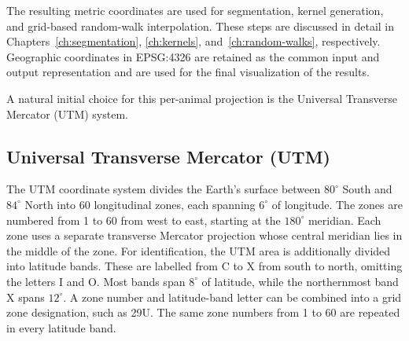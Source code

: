 The resulting metric coordinates are used for segmentation, kernel generation, and grid-based random-walk interpolation. 
These steps are discussed in detail in Chapters~\ref{ch:segmentation}, \ref{ch:kernels}, and~\ref{ch:random-walks}, respectively. 
Geographic coordinates in EPSG:4326 are retained as the common input and output representation and are used for the final visualization of the results.

A natural initial choice for this per-animal projection is the Universal Transverse Mercator (UTM) system.

\subsection{Universal Transverse Mercator (UTM)}
The UTM coordinate system divides the Earth's surface between \(80^\circ\) South and \(84^\circ\) North into 60 longitudinal zones, each spanning \(6^\circ\) of longitude. 
The zones are numbered from 1 to 60 from west to east, starting at the \(180^\circ\) meridian. 
Each zone uses a separate transverse Mercator projection whose central meridian lies in the middle of the zone.
For identification, the UTM area is additionally divided into latitude bands. These are labelled from C to X from south to north, omitting the letters I and O. 
Most bands span \(8^\circ\) 
of latitude, while the northernmost band X spans \(12^\circ\). A zone number and latitude-band letter can be combined into a grid zone designation, such as 29U. 
The same zone numbers from 1 to 60 are repeated in every latitude band.


